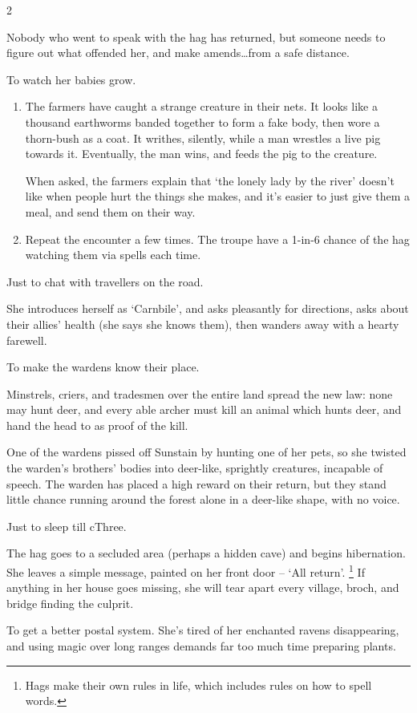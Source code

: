 \begin{multicols}{2}
\begin{dlist}
  Nobody who went to speak with the hag has returned, but someone needs to figure out what offended her, and make amends\ldots from a safe distance.
  \item
  To watch her babies grow.

  \begin{enumerate}
    \item
    The farmers have caught a strange creature in their nets.
    It looks like a thousand earthworms banded together to form a fake body, then wore a thorn-bush as a coat.
    It writhes, silently, while a man wrestles a live pig towards it.
    Eventually, the man wins, and feeds the pig to the creature.

    When asked, the farmers explain that `the lonely lady by the river' doesn't like when people hurt the things she makes, and it's easier to just give them a meal, and send them on their way.
    \item
    Repeat the encounter a few times.
    The troupe have a 1-in-6 chance of the hag watching them via spells each time.
  \end{enumerate}
  \item
  Just to chat with travellers on the road.

  She introduces herself as `Carnbile', and asks pleasantly for directions, asks about their allies' health (she says she knows them), then wanders away with a hearty farewell.
  \item
  To make the \glspl{warden} know their place.

  Minstrels, criers, and tradesmen over the entire land spread the new law: none may hunt deer, and every able archer must kill an animal which hunts deer, and hand the head to  as proof of the kill.

  One of the \glspl{warden} pissed off Sunstain by hunting one of her pets, so she twisted the \gls{warden}'s brothers' bodies into deer-like, sprightly creatures, incapable of speech.
  The \gls{warden} has placed a high reward on their return, but they stand little chance running around the forest alone in a deer-like shape, with no voice.
  \item
  Just to sleep till \gls{cThree}.

  The hag goes to a secluded area (perhaps a hidden cave) and begins hibernation.
  She leaves a simple message, painted on her front door -- `{All return}'.%
  \footnote{Hags make their own rules in life, which includes rules on how to spell words.}
  If anything in her house goes missing, she will tear apart every \gls{village}, \gls{broch}, and bridge finding the culprit.
  \item
  To get a better postal system.
  She's tired of her enchanted ravens disappearing, and using magic over long ranges demands far too much time preparing plants.


\end{dlist}
\end{multicols}
